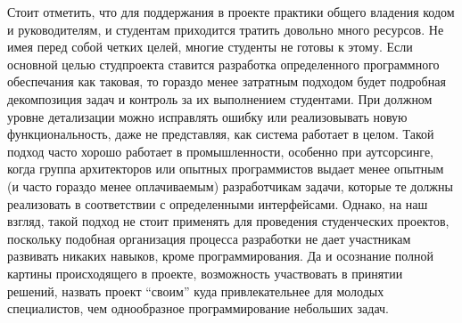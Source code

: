 \documentclass[a4paper]{article}
\begin{document}
Стоит отметить, что для поддержания в проекте практики общего владения кодом и руководителям, и студентам приходится тратить довольно много ресурсов. Не имея перед собой четких целей, многие студенты не готовы к этому. Если основной целью студпроекта ставится разработка определенного программного обеспечания как таковая, то гораздо менее затратным подходом будет подробная декомпозиция задач и контроль за их выполнением студентами.  При должном уровне детализации можно исправлять ошибку или реализовывать новую функциональность, даже не представляя, как система работает в целом. Такой подход часто хорошо работает в промышленности, особенно при аутсорсинге, когда группа архитекторов или опытных программистов выдает менее опытным (и часто гораздо менее оплачиваемым) разработчикам задачи, которые те должны реализовать в соответствии с определенными интерфейсами. Однако, на наш взгляд, такой подход не стоит применять для проведения студенческих проектов, поскольку подобная организация процесса разработки не дает участникам развивать никаких навыков, кроме программирования. Да и осознание полной картины происходящего в проекте, возможность участвовать в принятии решений, назвать проект ``своим'' куда привлекательнее для молодых специалистов, чем однообразное программирование небольших задач. 
\end{document}
